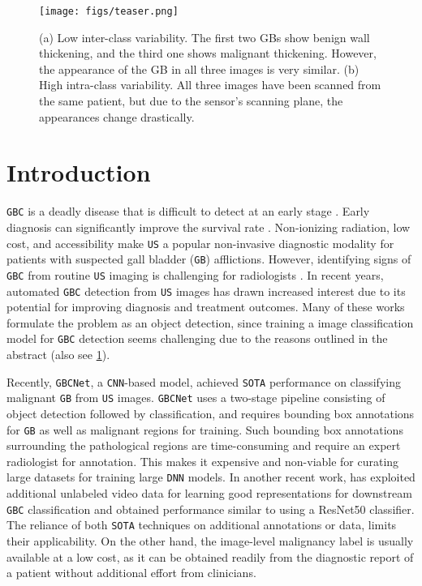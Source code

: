 \documentclass[runningheads]{llncs}
\def\cnn{\texttt{CNN}\xspace}
\def\dnn{\texttt{DNN}\xspace}
\def\sota{\texttt{SOTA}\xspace}
\def\gbc{\texttt{GBC}\xspace}
\def\gb{\texttt{GB}\xspace}
\def\us{\texttt{US}\xspace}
\def\gbcnet{\texttt{GBCNet}\xspace}
\begin{document}
\begin{figure}[t]
    \centering
    \texttt{[image: figs/teaser.png]}
    \caption{(a) Low inter-class variability. The first two GBs show benign wall thickening, and the third one shows malignant thickening. However, the appearance of the GB in all three images is very similar. (b) High intra-class variability. All three images have been scanned from the same patient, but due to the sensor's scanning plane, the appearances change drastically.}
    \label{fig:teaser}
\end{figure}

%
%
\section{Introduction}
%
\gbc is a deadly disease that is difficult to detect at an early stage \cite{howlader2017seer,gupta2021locally}. Early diagnosis can significantly improve the survival rate \cite{hong2014surgical}. Non-ionizing radiation, low cost, and accessibility make \us a popular non-invasive diagnostic modality for patients with suspected gall bladder (\gb) afflictions. However, identifying signs of \gbc from routine \us imaging is challenging for radiologists \cite{gupta2020imaging}. In recent years, automated \gbc detection from \us images has drawn increased interest \cite{basu2022surpassing,basu2022unsupervised} due to its potential for improving diagnosis and treatment outcomes. Many of these works formulate the problem as an object detection, since training a image classification model for \gbc detection seems challenging due to the reasons outlined in the abstract (also see \cref{fig:teaser}).

Recently, \gbcnet \cite{basu2022surpassing}, a \cnn-based model, achieved \sota performance on classifying malignant \gb from \us images. \gbcnet uses a two-stage pipeline consisting of object detection followed by classification, and requires bounding box annotations for \gb as well as malignant regions for training. Such bounding box annotations surrounding the pathological regions are time-consuming and require an expert radiologist for annotation. This makes it expensive and non-viable for curating large datasets for training large \dnn models. In another recent work, \cite{basu2022unsupervised} has exploited additional unlabeled video data for learning good representations for downstream \gbc classification and obtained performance similar to \cite{basu2022surpassing} using a ResNet50 \cite{resnet} classifier. The reliance of both \sota techniques on additional annotations or data, limits their applicability. On the other hand, the image-level malignancy label is usually available at a low cost, as it can be obtained readily from the diagnostic report of a patient without additional effort from clinicians. 
\end{document}

